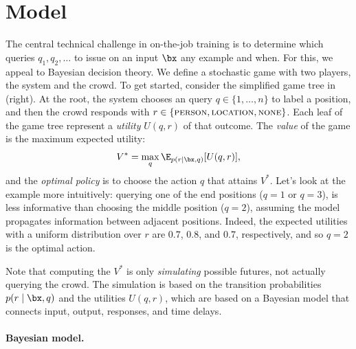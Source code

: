 \section{Model}
\label{sec:model}

The central technical challenge in on-the-job training
is to determine which queries $q_1, q_2, \dots$ to issue on an input $\bx$
any example and when.  For this, we appeal to Bayesian decision theory.
We define a stochastic game with two players, the system and the crowd.
To get started, consider the simplified game tree in (right).
At the root, the system chooses an query $q \in \{1, \dots, n\}$ to label a position,
and then the crowd responds with $r \in \{ \textsc{person}{}, \textsc{location}{}, \textsc{none}{} \}$.
Each leaf of the game tree represent a \emph{utility} $U(q, r)$ of that outcome.
The \emph{value} of the game is the maximum expected utility:
\begin{align}
  V^* = \max_q \E_{p(r \mid \bx, q)}[U(q, r)],
\end{align}
and the \emph{optimal policy} is to choose the action $q$ that attains $V^*$.
Let's look at the example more intuitively:
querying one of the end positions ($q = 1$ or $q = 3$),
is less informative than choosing the middle position ($q = 2$),
assuming the model propagates information between adjacent positions.
Indeed, the expected utilities with a uniform distribution over $r$
are $0.7$, $0.8$, and $0.7$, respectively, and so $q = 2$ is the optimal action.

Note that computing the $V^*$ is only \emph{simulating} possible futures,
not actually querying the crowd.  The simulation is based on the transition
probabilities $p(r \mid \bx, q)$ and the utilities $U(q, r)$, which are
based on a Bayesian model that connects input, output, responses, and time delays.

\paragraph{Bayesian model.}

